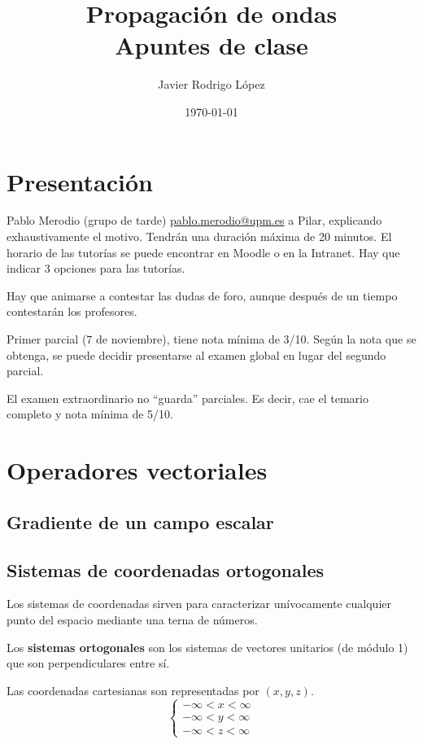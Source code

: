 \documentclass[10pt]{book}
\title{\Huge Propagación de ondas\\\huge Apuntes de clase}
\author{Javier Rodrigo López}
\date{\today}
\begin{document}
\maketitle

\tableofcontents


\newpage

\chapter*{Presentación}

Pablo Merodio (grupo de tarde) \href{mailto:pablo.merodio@upm.es}{pablo.merodio@upm.es} a Pilar, explicando exhaustivamente el motivo. Tendrán una duración máxima de 20 minutos. El horario de las tutorías se puede encontrar en Moodle o en la Intranet. Hay que indicar 3 opciones para las tutorías.

Hay que animarse a contestar las dudas de foro, aunque después de un tiempo contestarán los profesores.

Primer parcial (7 de noviembre), tiene nota mínima de 3/10. Según la nota que se obtenga, se puede decidir presentarse al examen global en lugar del segundo parcial.

El examen extraordinario no ``guarda'' parciales. Es decir, cae el temario completo y nota mínima de 5/10.

\newpage

\chapter{Operadores vectoriales}
\section{Gradiente de un campo escalar}

\section{Sistemas de coordenadas ortogonales}

Los sistemas de coordenadas sirven para caracterizar unívocamente cualquier punto del espacio mediante una terna de números.

Los \textbf{sistemas ortogonales} son los sistemas de vectores unitarios (de módulo 1) que son perpendiculares entre sí.

Las coordenadas cartesianas son representadas por $\left( x,y,z \right)$.
\[\left\lbrace \begin{matrix}
    -\infty < x < \infty \\
    -\infty < y < \infty \\
    -\infty < z < \infty
  \end{matrix} \right.\]
\end{document}
